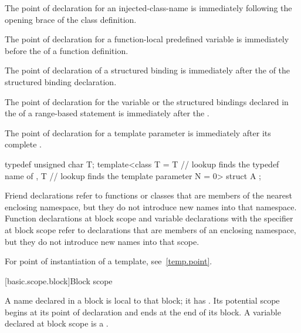 \pnum
The point of declaration for an
injected-class-name is immediately following
the opening brace of the class definition.

\pnum
The point of declaration for a function-local predefined
variable is immediately before the
 of a function definition.

\pnum
The point of declaration of a structured binding
is immediately after
the  of the structured binding declaration.

\pnum
The point of declaration for the variable or the structured bindings
declared in the 
of a range-based  statement
is immediately after the .

\pnum
The point of declaration for a template parameter is immediately after its complete
.
\begin{example}
\begin{codeblock}
typedef unsigned char T;
template<class T
  = T               // lookup finds the typedef name of 
  , T               // lookup finds the template parameter
    N = 0> struct A { };
\end{codeblock}
\end{example}

\pnum
\begin{note}
Friend declarations refer to functions or classes that are
members of the nearest enclosing namespace, but they do not introduce
new names into that namespace. Function
declarations at block scope and variable declarations with the
 specifier at block scope refer to declarations that are
members of an enclosing namespace, but they do not introduce new names
into that scope.
\end{note}

\pnum
\begin{note}
For point of instantiation of a template, see~\ref{temp.point}.
\end{note}
%

[basic.scope.block]{Block scope}

\pnum
{}%
%
A name declared in a block is local to that block; it has
.
Its potential scope begins at its point of
declaration and ends at the end of its block.
A variable declared at block scope is a .

